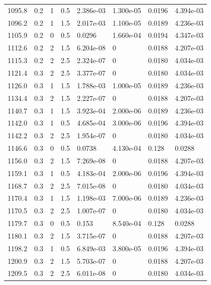 \documentclass[preview]{standalone}
\begin{document}
{{{\begin{tabular}{L{1.2cm}C{1.2cm} C{0.3cm}C{0.5cm} C{1.4cm}C{1.4cm} C{1.4cm}C{1.4cm}}
  1095.8  &   0.2  & 1     & 0.5 &  2.386e-03  & 1.300e-05  & 0.0196 &  4.394e-03   \\ 
  1096.2  &   0.2  & 1     & 1.5 &  2.017e-03  & 1.100e-05  & 0.0189 &  4.236e-03   \\ 
  1105.9  &   0.2  & 0     & 0.5 &  0.0296  & 1.660e-04  & 0.0194 &  4.347e-03   \\ 
  1112.6  &   0.2  & 2     & 1.5 &  6.204e-08  & 0  & 0.0188 &  4.207e-03   \\ 
  1115.3  &   0.2  & 2     & 2.5 &  2.324e-07  & 0  & 0.0180 &  4.034e-03   \\ 
  1121.4  &   0.3  & 2     & 2.5 &  3.377e-07  & 0  & 0.0180 &  4.034e-03   \\ 
  1126.0  &   0.3  & 1     & 1.5 &  1.788e-03  & 1.000e-05  & 0.0189 &  4.236e-03   \\ 
  1134.4  &   0.3  & 2     & 1.5 &  2.227e-07  & 0  & 0.0188 &  4.207e-03   \\ 
  1140.7  &   0.3  & 1     & 1.5 &  3.923e-04  & 2.000e-06  & 0.0189 &  4.236e-03   \\ 
  1142.0  &   0.3  & 1     & 0.5 &  4.685e-04  & 3.000e-06  & 0.0196 &  4.394e-03   \\ 
  1142.2  &   0.3  & 2     & 2.5 &  1.954e-07  & 0  & 0.0180 &  4.034e-03   \\ 
  1146.6  &   0.3  & 0     & 0.5 &  0.0738  & 4.130e-04  & 0.128 &  0.0288   \\ 
  1156.0  &   0.3  & 2     & 1.5 &  7.269e-08  & 0  & 0.0188 &  4.207e-03   \\ 
  1159.1  &   0.3  & 1     & 0.5 &  4.183e-04  & 2.000e-06  & 0.0196 &  4.394e-03   \\ 
  1168.7  &   0.3  & 2     & 2.5 &  7.015e-08  & 0  & 0.0180 &  4.034e-03   \\ 
  1170.4  &   0.3  & 1     & 1.5 &  1.198e-03  & 7.000e-06  & 0.0189 &  4.236e-03   \\ 
  1170.5  &   0.3  & 2     & 2.5 &  1.007e-07  & 0  & 0.0180 &  4.034e-03   \\ 
  1179.7  &   0.3  & 0     & 0.5 &  0.153  & 8.540e-04  & 0.128 &  0.0288   \\ 
  1180.1  &   0.3  & 2     & 1.5 &  3.715e-07  & 0  & 0.0188 &  4.207e-03   \\ 
  1198.2  &   0.3  & 1     & 0.5 &  6.849e-03  & 3.800e-05  & 0.0196 &  4.394e-03   \\ 
  1200.9  &   0.3  & 2     & 1.5 &  5.703e-07  & 0  & 0.0188 &  4.207e-03   \\ 
  1209.5  &   0.3  & 2     & 2.5 &  6.011e-08  & 0  & 0.0180 &  4.034e-03   \\ 

\end{tabular}}}}
\end{document}
